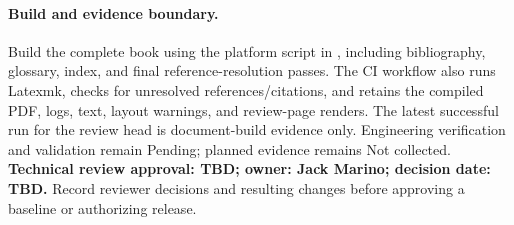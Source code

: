 \paragraph{Build and evidence boundary.}
Build the complete book using the platform script in
, including bibliography, glossary, index, and final
reference-resolution passes. The CI workflow also runs Latexmk, checks for
unresolved references/citations, and retains the compiled PDF, logs, text,
layout warnings, and review-page renders. The latest successful run for the
review head is document-build evidence only. Engineering verification and
validation remain Pending; planned evidence remains Not collected.
\textbf{Technical review approval: TBD; owner: Jack Marino; decision date: TBD.}
Record reviewer decisions and resulting changes before approving a baseline
or authorizing release.

